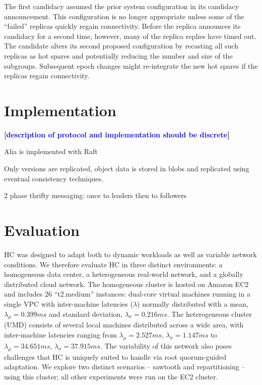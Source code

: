 \documentclass[10pt,conference]{IEEEtran}
\renewcommand{\pjk}[1]{{\bf
    [\marginpar[\hbox{{\textcolor{blue}{pjk}}\raisebox{0ex}{\Huge $\rightarrow$}}]%
{\hbox{\raisebox{0ex}{\Huge $\leftarrow$}{\textcolor{blue}{pjk}}}}\textcolor{blue}{#1}]}}
\begin{document}
The first candidacy assumed the prior system configuration in its candidacy
announcement.
This configuration is no longer appropriate unless some of the ``failed''
replicas quickly regain connectivity.
Before the replica announces its candidacy for a second time, however, many of
the replica replies have timed out.
The candidate alters its second proposed configuration by recasting all such
replicas as hot spares and potentially reducing the number and size of the
subgroups.
Subsequent epoch changes might re-integrate the new hot spares if the replicas
regain connectivity.

\section{Implementation}
\label{section:implementation}

\pjk{description of protocol and implementation should be discrete}

Alia is implemented with Raft

Only versions are replicated, object data is stored in blobs and replicated using
eventual consistency techniques.

2 phase thrifty messaging: once to leaders then to followers

\section{Evaluation}
\label{section:evaluation}

HC was designed to adapt both to dynamic workloads as well as variable network
conditions.
We therefore evaluate HC in three distinct environments: a homogeneous data center, a
heterogeneous real-world network, and a globally distributed cloud network.
The homogeneous cluster is hosted on Amazon EC2 and includes 26 ``t2.medium'' instances:
dual-core virtual machines running in a single VPC with inter-machine latencies
($\lambda$) normally distributed with a mean, $\lambda_{\mu}=0.399ms$ and standard
deviation, $\lambda_{\sigma}=0.216ms$.
The heterogeneous cluster (UMD) consists of several local machines distributed across a
wide area, with inter-machine latencies ranging from
$\lambda_{\mu}=2.527ms$,
$\lambda_{\sigma}=1.147ms$ to $\lambda_{\mu}=34.651ms$,
$\lambda_{\sigma}=37.915ms$.
The variability of this network also poses challenges that HC is uniquely suited to
handle via root quorum-guided adaptation.
We explore two distinct scenarios -- sawtooth and repartitioning -- using this cluster;
all other experiments were run on the EC2 cluster.
\end{document}
